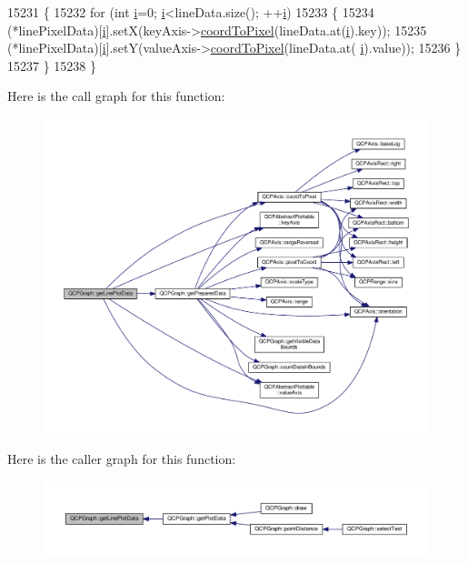 \begin{DoxyCode}
15231   \{
15232     \textcolor{keywordflow}{for} (\textcolor{keywordtype}{int} \hyperlink{_comparision_pictures_2_createtest_image_8m_a6f6ccfcf58b31cb6412107d9d5281426}{i}=0; \hyperlink{_comparision_pictures_2_createtest_image_8m_a6f6ccfcf58b31cb6412107d9d5281426}{i}<lineData.size(); ++\hyperlink{_comparision_pictures_2_createtest_image_8m_a6f6ccfcf58b31cb6412107d9d5281426}{i})
15233     \{
15234       (*linePixelData)[\hyperlink{_comparision_pictures_2_createtest_image_8m_a6f6ccfcf58b31cb6412107d9d5281426}{i}].setX(keyAxis->\hyperlink{class_q_c_p_axis_a985ae693b842fb0422b4390fe36d299a}{coordToPixel}(lineData.at(\hyperlink{_comparision_pictures_2_createtest_image_8m_a6f6ccfcf58b31cb6412107d9d5281426}{i}).key));
15235       (*linePixelData)[\hyperlink{_comparision_pictures_2_createtest_image_8m_a6f6ccfcf58b31cb6412107d9d5281426}{i}].setY(valueAxis->\hyperlink{class_q_c_p_axis_a985ae693b842fb0422b4390fe36d299a}{coordToPixel}(lineData.at(
      \hyperlink{_comparision_pictures_2_createtest_image_8m_a6f6ccfcf58b31cb6412107d9d5281426}{i}).value));
15236     \}
15237   \}
15238 \}
\end{DoxyCode}


Here is the call graph for this function\+:\nopagebreak
\begin{figure}[H]
\begin{center}
\leavevmode
\includegraphics[width=350pt]{class_q_c_p_graph_ae3d82ffd0c9a883482aabf47b0e6b5ee_cgraph}
\end{center}
\end{figure}




Here is the caller graph for this function\+:\nopagebreak
\begin{figure}[H]
\begin{center}
\leavevmode
\includegraphics[width=350pt]{class_q_c_p_graph_ae3d82ffd0c9a883482aabf47b0e6b5ee_icgraph}
\end{center}
\end{figure}


